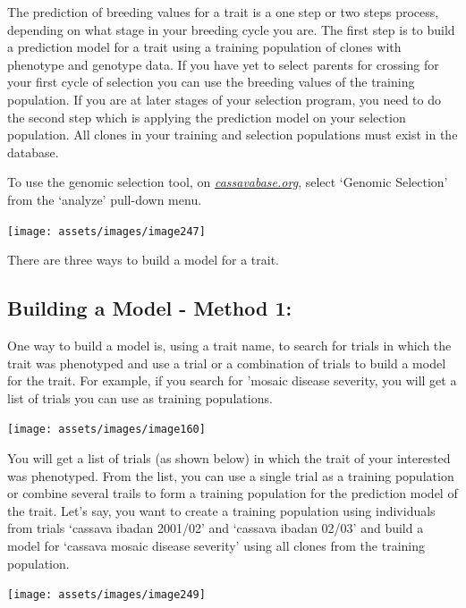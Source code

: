 \documentclass[
  12pt,
]{book}
\begin{document}
The prediction of breeding values for a trait is a one step or two steps process, depending on what stage in your breeding cycle you are. The first step is to build a prediction model for a trait using a training population of clones with phenotype and genotype data. If you have yet to select parents for crossing for your first cycle of selection you can use the breeding values of the training population. If you are at later stages of your selection program, you need to do the second step which is applying the prediction model on your selection population. All clones in your training and selection populations must exist in the database.

To use the genomic selection tool, on \href{http://cassavabase.org/}{\emph{cassavabase.org}}, select `Genomic Selection' from the `analyze' pull-down menu.

\begin{center}\texttt{[image: assets/images/image247]} \end{center}

There are three ways to build a model for a trait.

\hypertarget{method-1}{%
\subsection{Building a Model - Method 1:}\label{method-1}}

One way to build a model is, using a trait name, to search for trials in which the trait was phenotyped and use a trial or a combination of trials to build a model for the trait. For example, if you search for 'mosaic disease severity, you will get a list of trials you can use as training populations.

\begin{center}\texttt{[image: assets/images/image160]} \end{center}

You will get a list of trials (as shown below) in which the trait of your interested was phenotyped. From the list, you can use a single trial as a training population or combine several trails to form a training population for the prediction model of the trait. Let's say, you want to create a training population using individuals from trials `cassava ibadan 2001/02' and `cassava ibadan 02/03' and build a model for `cassava mosaic disease severity' using all clones from the training population.

\begin{center}\texttt{[image: assets/images/image249]} \end{center}
\end{document}
